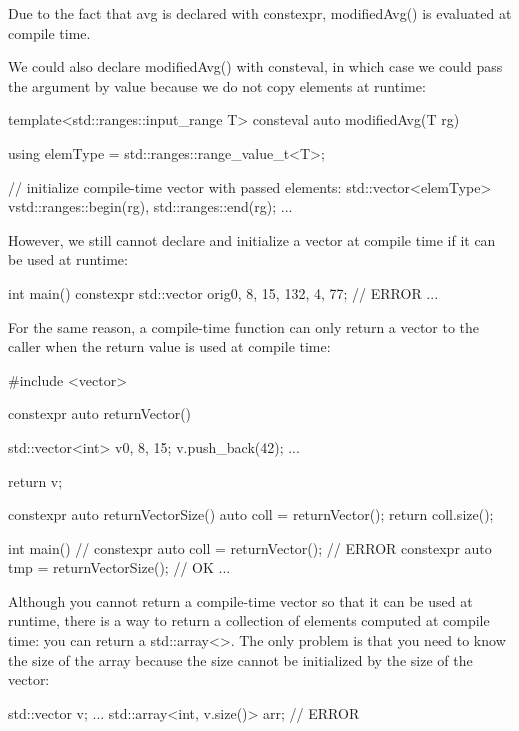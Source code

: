 Due to the fact that avg is declared with constexpr, modifiedAvg() is evaluated at compile time.

We could also declare modifiedAvg() with consteval, in which case we could pass the argument by value because we do not copy elements at runtime:

\begin{cpp}
template<std::ranges::input_range T>
consteval auto modifiedAvg(T rg)
{
	using elemType = std::ranges::range_value_t<T>;
	
	// initialize compile-time vector with passed elements:
	std::vector<elemType> v{std::ranges::begin(rg),
							std::ranges::end(rg)};
	...
}
\end{cpp}

However, we still cannot declare and initialize a vector at compile time if it can be used at runtime:

\begin{cpp}
int main()
{
	constexpr std::vector orig{0, 8, 15, 132, 4, 77}; // ERROR
	...
}
\end{cpp}

For the same reason, a compile-time function can only return a vector to the caller when the return value is used at compile time:


\begin{cpp}
#include <vector>

constexpr auto returnVector()
{
	std::vector<int> v{0, 8, 15};
	v.push_back(42);
	...
	
	return v;
}

constexpr auto returnVectorSize()
{
	auto coll = returnVector();
	return coll.size();
}
	
int main()
{
	// constexpr auto coll = returnVector(); // ERROR
	constexpr auto tmp = returnVectorSize(); // OK
	...
}
\end{cpp}


Although you cannot return a compile-time vector so that it can be used at runtime, there is a way to return a collection of elements computed at compile time: you can return a std::array<>. The only problem is that you need to know the size of the array because the size cannot be initialized by the size of the vector:

\begin{cpp}
std::vector v;
...
std::array<int, v.size()> arr; // ERROR
\end{cpp}

